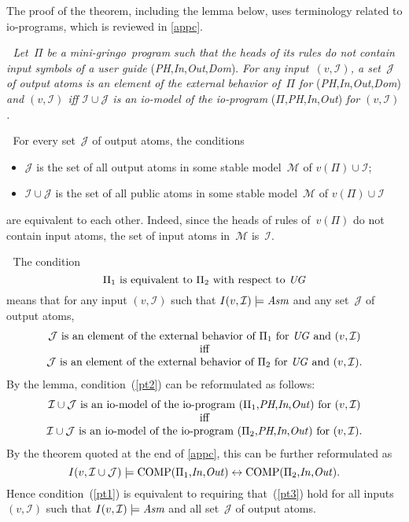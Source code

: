 \documentclass{tlp}
\def\lrar{\leftrightarrow}
\def\beq{\begin{equation}}
\def\eeq#1{\label{#1}\end{equation}}
\def\ba{\begin{array}}
\def\ea{\end{array}}
\def\gringo{{\sc gringo}}
\newcommand{\I}{\mathcal{I}}
\newcommand{\J}{\mathcal{J}}
\newcommand{\M}{\mathcal{M}}
\begin{document}
The proof of the theorem, including the lemma below, uses
terminology related to io-programs, which
is reviewed in \ref{appc}.

\medskip{}$\;$\emph{
Let~$\Pi$ be a mini-\gringo\ program such that the heads of its rules do not
contain input symbols of a user guide}
(\emph{PH},\emph{In},\emph{Out},\emph{Dom\/}). \emph{For any
  input~$(v,\I)$, a set~$\J$ of
  output atoms is an element of the external behavior
  of~$\Pi$ for} (\emph{PH},\emph{In},\emph{Out},\emph{Dom\/})
\emph{and $(v,\I)$ iff
$\I\cup\J$ is an io-model of the io-program}
($\Pi$,\emph{PH},\emph{In},\emph{Out}) \emph{for $(v,\I)$.}

\medskip{}$\;$
For every set~$\J$ of output atoms, the conditions
\begin{itemize}
\item $\J$ is the set of all output atoms in some stable model~$\M$ 
  of $v(\Pi)\cup\I$;
\item $\I\cup\J$ is the set of all public atoms in some stable
  model~$\M$ of $v(\Pi)\cup\I$
\end{itemize}
are equivalent to each other.  Indeed,
since the heads of rules of~$v(\Pi)$ do not contain
input atoms, the set of input atoms in~$\M$ is~$\I$.

\medskip{}$\;$
The condition
\beq
\Pi_1\hbox{ is equivalent to }\Pi_2\hbox{ with respect to }\emph{UG}
\eeq{pt1}
means that for any input $(v,\I)$ such that $I(v,\I)\models\emph{Asm}$
and any set~$\J$ of output atoms,
\beq\ba c
\J\hbox{ is an element of the external behavior
  of~$\Pi_1$ for \emph{UG} and }(v,\I)\\
\hbox{iff}\\
\J\hbox{ is an element of the external behavior
  of~$\Pi_2$ for \emph{UG} and }(v,\I).
\ea\eeq{pt2}
By the lemma, condition~(\ref{pt2}) can be reformulated as follows:
$$\ba c
\I\cup\J\hbox{ is an io-model of the io-program
($\Pi_1$,\emph{PH},\emph{In},\emph{Out}) for }(v,\I)\\
\hbox{iff}\\
\I\cup\J\hbox{ is an io-model of the io-program
($\Pi_2$,\emph{PH},\emph{In},\emph{Out}) for }(v,\I).\\
\ea$$
By the theorem quoted at the end of \ref{appc}, this can be further
reformulated as
\beq I(v,\I\cup\J) \models
\hbox{COMP($\Pi_1$,\emph{In\/},\emph{Out\/})}
\lrar
\hbox{COMP($\Pi_2$,\emph{In\/},\emph{Out\/})}.
\eeq{pt3}
Hence condition~(\ref{pt1}) is equivalent to requiring that~(\ref{pt3})
hold for all inputs $(v,\I)$ such that
$I(v,\I)\models\emph{Asm}$ and all set~$\J$ of output atoms.
\end{document}

